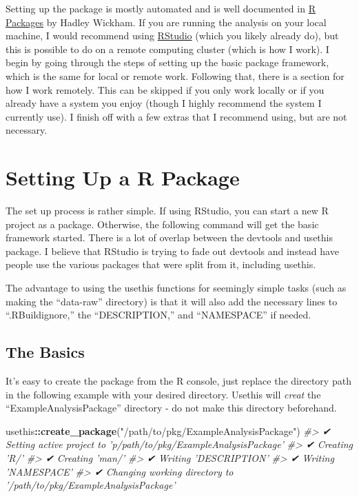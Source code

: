 \documentclass[]{book}
\newenvironment{Shaded}{\begin{snugshade}}{\end{snugshade}}
\newcommand{\CommentTok}[1]{\textcolor[rgb]{0.56,0.35,0.01}{\textit{#1}}}
\newcommand{\KeywordTok}[1]{\textcolor[rgb]{0.13,0.29,0.53}{\textbf{#1}}}
\newcommand{\NormalTok}[1]{#1}
\newcommand{\OperatorTok}[1]{\textcolor[rgb]{0.81,0.36,0.00}{\textbf{#1}}}
\newcommand{\StringTok}[1]{\textcolor[rgb]{0.31,0.60,0.02}{#1}}
\begin{document}
Setting up the package is mostly automated and is well documented in \href{https://r-pkgs.org/index.html}{R Packages} by Hadley Wickham. If you are running the analysis on your local machine, I would recommend using \href{https://www.rstudio.com}{RStudio} (which you likely already do), but this is possible to do on a remote computing cluster (which is how I work). I begin by going through the steps of setting up the basic package framework, which is the same for local or remote work. Following that, there is a section for how I work remotely. This can be skipped if you only work locally or if you already have a system you enjoy (though I highly recommend the system I currently use). I finish off with a few extras that I recommend using, but are not necessary.

\hypertarget{setting-up-a-r-package}{%
\section{Setting Up a R Package}\label{setting-up-a-r-package}}

The set up process is rather simple. If using RStudio, you can start a new R project as a package. Otherwise, the following command will get the basic framework started. There is a lot of overlap between the devtools and usethis package. I believe that RStudio is trying to fade out devtools and instead have people use the various packages that were split from it, including usethis.

The advantage to using the usethis functions for seemingly simple tasks (such as making the ``data-raw'' directory) is that it will also add the necessary lines to ``.RBuildignore,'' the ``DESCRIPTION,'' and ``NAMESPACE'' if needed.

\hypertarget{the-basics}{%
\subsection{The Basics}\label{the-basics}}

It's easy to create the package from the R console, just replace the directory path in the following example with your desired directory. Usethis will \emph{creat} the ``ExampleAnalysisPackage'' directory - do not make this directory beforehand.

\begin{Shaded}
\begin{Highlighting}[]
\NormalTok{usethis}\OperatorTok{::}\KeywordTok{create_package}\NormalTok{(}\StringTok{"/path/to/pkg/ExampleAnalysisPackage"}\NormalTok{)}
\CommentTok{#> ✔ Setting active project to 'p/path/to/pkg/ExampleAnalysisPackage'}
\CommentTok{#> ✔ Creating 'R/'}
\CommentTok{#> ✔ Creating 'man/'}
\CommentTok{#> ✔ Writing 'DESCRIPTION'}
\CommentTok{#> ✔ Writing 'NAMESPACE'}
\CommentTok{#> ✔ Changing working directory to '/path/to/pkg/ExampleAnalysisPackage'}
\end{Highlighting}
\end{Shaded}
\end{document}
